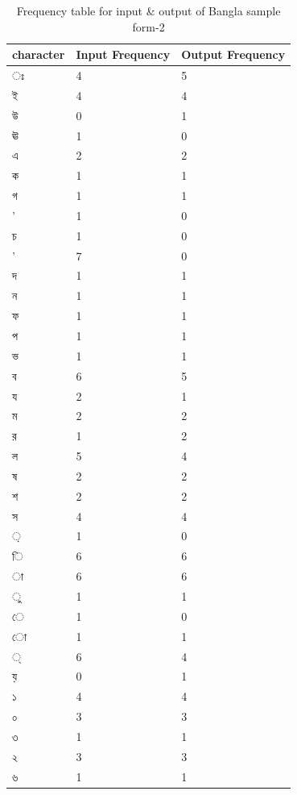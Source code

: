 \begin{table}[H]
\centering
\begin{tabular}{|p{2cm}|p{2cm}|p{2cm}|}
\hline
character & Input Frequency & Output Frequency \\
\hline
{\bengalifont ঃ} & 4 & 5\\
\hline
{\bengalifont ই} & 4 & 4\\
\hline
{\bengalifont উ} & 0 & 1\\
\hline
{\bengalifont ঊ} & 1 & 0\\
\hline
{\bengalifont এ} & 2 & 2\\
\hline
{\bengalifont ক} & 1 & 1\\
\hline
{\bengalifont গ} & 1 & 1\\
\hline
{\bengalifont ’} & 1 & 0\\
\hline
{\bengalifont চ} & 1 & 0\\
\hline
{\bengalifont '} & 7 & 0\\
\hline
{\bengalifont দ} & 1 & 1\\
\hline
{\bengalifont ন} & 1 & 1\\
\hline
{\bengalifont ফ} & 1 & 1\\
\hline
{\bengalifont প} & 1 & 1\\
\hline
{\bengalifont ভ} & 1 & 1\\
\hline
{\bengalifont ব} & 6 & 5\\
\hline
{\bengalifont য} & 2 & 1\\
\hline
{\bengalifont ম} & 2 & 2\\
\hline
{\bengalifont র} & 1 & 2\\
\hline
{\bengalifont ল} & 5 & 4\\
\hline
{\bengalifont ষ} & 2 & 2\\
\hline
{\bengalifont শ} & 2 & 2\\
\hline
{\bengalifont স} & 4 & 4\\
\hline
{\bengalifont ়} & 1 & 0\\
\hline
{\bengalifont ি} & 6 & 6\\
\hline
{\bengalifont া} & 6 & 6\\
\hline
{\bengalifont ু} & 1 & 1\\
\hline
{\bengalifont ে} & 1 & 0\\
\hline
{\bengalifont ো} & 1 & 1\\
\hline
{\bengalifont ্} & 6 & 4\\
\hline
{\bengalifont য়} & 0 & 1\\
\hline
{\bengalifont ১} & 4 & 4\\
\hline
{\bengalifont ০} & 3 & 3\\
\hline
{\bengalifont ৩} & 1 & 1\\
\hline
{\bengalifont ২} & 3 & 3\\
\hline
{\bengalifont ৬} & 1 & 1\\
\hline
\end{tabular}
\caption {Frequency table for input \& output of Bangla sample form-2}
\label {tab:BTable2}
\end{table}


